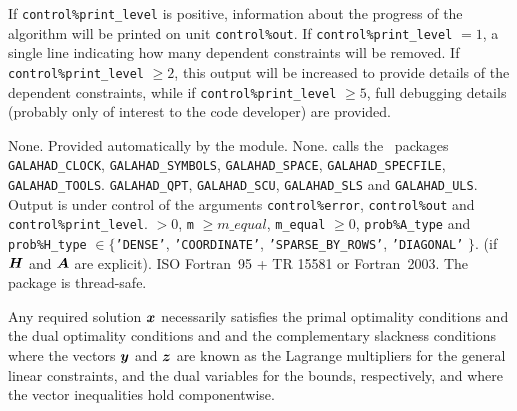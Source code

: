 \documentclass{galahad}
\newcommand{\packagename}{CRO}
\begin{document}

\galinfo
If {\tt control\%print\_level} is positive, information about the progress
of the algorithm will be printed on unit {\tt control\-\%out}.
If {\tt control\%print\_level} $= 1$, a single line indicating how many
dependent constraints will be removed.
If {\tt control\%print\_level} $\geq 2$, this
output will be increased to provide details of the dependent constraints,
while if {\tt control\%print\_level} $\geq 5$, full debugging details
(probably only of interest to the code developer) are provided.


\galgeneral

\galcommon None.
\galworkspace Provided automatically by the module.
\galroutines None.
\galmodules {\tt \packagename\_crossover} calls the \galahad\ packages
{\tt GALAHAD\_CLOCK},
{\tt GALAHAD\_SY\-M\-BOLS},
{\tt GALAHAD\-\_SPACE},
{\tt GALAHAD\_\-SPECFILE},
{\tt GALAHAD\_TOOLS}.
{\tt GALAHAD\_QPT},
{\tt GALAHAD\_\-SCU},
{\tt GALAHAD\_\-SLS}
and
{\tt GALAHAD\_\-ULS}.
\galio Output is under control of the arguments
 {\tt control\%error}, {\tt control\%out} and {\tt control\%print\_level}.
 $> 0$, {\tt m} $\geq  m\_equal$,
{\tt m\_equal} $\geq  0$,
{\tt prob\%A\_type} and {\tt prob\%H\_type} $\in \{${\tt 'DENSE'},
 {\tt 'COORDINATE'}, {\tt 'SPARSE\_BY\_\-ROWS'}, {\tt 'DIAGONAL'} $\}$.
(if ${\bm{H}}$ and ${\bm{A}}$ are explicit).
\galportability ISO Fortran~95 + TR 15581 or Fortran~2003.
The package is thread-safe.


\galmethod
Any required solution ${\bm{x}}$ necessarily satisfies
the primal optimality conditions
and
the dual optimality conditions
and
and the complementary slackness conditions
where the vectors ${\bm{y}}$ and ${\bm{z}}$ are
known as the Lagrange multipliers for
the general linear constraints, and the dual variables for the bounds,
respectively, and where the vector inequalities hold componentwise.
\end{document}
